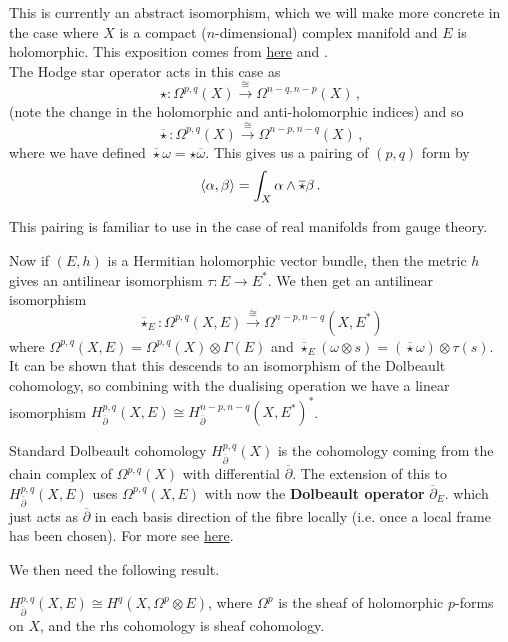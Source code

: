 \documentclass{article}
\begin{document}
This is currently an abstract isomorphism, which we will make more concrete in the case where $X$ is a compact ($n$-dimensional) complex manifold and $E$ is holomorphic. This exposition comes from \href{https://en.wikipedia.org/wiki/Serre_duality}{here} and \cite{Huybrechts2005}. \\
The Hodge star operator acts in this case as 
\[
\star : \Omega^{p,q}(X) \overset{\cong}{\to} \Omega^{n-q,n-p}(X) \, ,
\]
(note the change in the holomorphic and anti-holomorphic indices) and so
\[
\overline{\star} : \Omega^{p,q}(X) \overset{\cong}{\to} \Omega^{n-p,n-q}(X) \, ,
\]
where we have defined $\overline{\star}\omega = \star \overline{\omega}$. This gives us a pairing of $(p,q)$ form by 
\[
\left\langle \alpha,\beta \right\rangle = \int_X \alpha \wedge \overline{\star}\beta \, .
\]
\begin{remark}
	This pairing is familiar to use in the case of real manifolds from gauge theory. 
\end{remark}
Now if $(E,h)$ is a Hermitian holomorphic vector bundle, then the metric $h$ gives an antilinear isomorphism $\tau:E \to E^\ast$. We then get an antilinear isomorphism 
\[
\overline{\star}_E : \Omega^{p,q}(X,E) \overset{\cong}{\to} \Omega^{n-p,n-q}(X,E^\ast)
\]
where $\Omega^{p,q}(X,E) = \Omega^{p,q}(X) \otimes \Gamma(E)$ and $\overline{\star}_E(\omega \otimes s) = (\overline{\star}\omega) \otimes \tau(s)$.\\
It can be shown that this descends to an isomorphism of the Dolbeault cohomology, so combining with the dualising operation we have a linear isomorphism $H^{p,q}_{\overline{\partial}}(X,E) \cong H^{n-p,n-q}_{\overline{\partial}}(X,E^\ast)^\ast$.
\begin{remark}
	Standard Dolbeault cohomology $H^{p,q}_{\overline{\partial}}(X)$ is the cohomology coming from the chain complex of $\Omega^{p,q}(X)$ with differential $\overline{\partial}$. The extension of this to $H^{p,q}_{\overline{\partial}}(X,E)$ uses $\Omega^{p,q}(X,E)$ with now the  \textbf{Dolbeault operator} $\overline{\partial}_E$. which just acts as $\overline{\partial}$ in each basis direction of the fibre locally (i.e. once a local frame has been chosen). For more see \href{https://en.wikipedia.org/wiki/Holomorphic_vector_bundle}{here}. 
\end{remark}
 We then need the following result.
\begin{theorem}
	$H^{p,q}_{\overline{\partial}}(X,E) \cong H^q(X,\Omega^p \otimes E)$, where $\Omega^p$ is the sheaf of holomorphic $p$-forms on $X$, and the rhs cohomology is sheaf cohomology.
\end{theorem}
\end{document}
